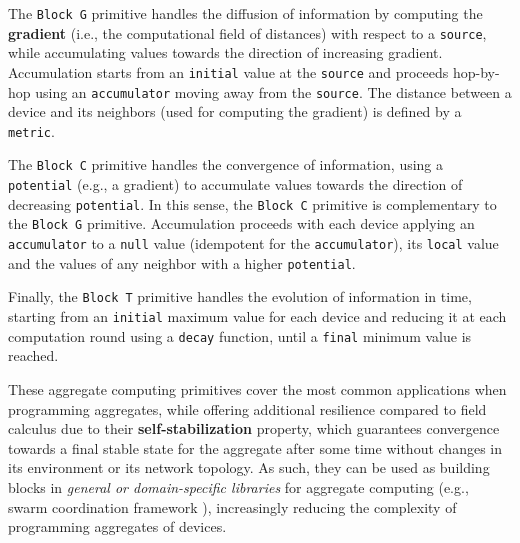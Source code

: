 The \texttt{Block G} primitive \cite{CAS-AggregateComputingBlocks} handles the
diffusion of information by computing the \textbf{gradient} (i.e., the
computational field of distances) with respect to a \texttt{source}, while
accumulating values towards the direction of increasing gradient. Accumulation
starts from an \texttt{initial} value at the \texttt{source} and proceeds
hop-by-hop using an \texttt{accumulator} moving away from the \texttt{source}.
The distance between a device and its neighbors (used for computing the
gradient) is defined by a \texttt{metric}.

The \texttt{Block C} primitive handles the convergence of information, using a
\texttt{potent\-ial} (e.g., a gradient) to accumulate values towards the
direction of decreasing \texttt{potent\-ial}. In this sense, the \texttt{Block
C} primitive is complementary to the \texttt{Block G} primitive. Accumulation
proceeds with each device applying an \texttt{accumulator} to a \texttt{null}
value (idempotent for the \texttt{accumulator}), its \texttt{local} value and
the values of any neighbor with a higher \texttt{potential}.

Finally, the \texttt{Block T} primitive handles the evolution of information in
time, starting from an \texttt{initial} maximum value for each device and
reducing it at each computation round using a \texttt{decay} function, until a
\texttt{final} minimum value is reached.

These aggregate computing primitives cover the most common applications when
programming aggregates, while offering additional resilience compared to field
calculus due to their \textbf{self-stabilization} property, which guarantees
convergence towards a final stable state for the aggregate after some time
without changes in its environment or its network topology. As such, they can
be used as building blocks in \textit{general or domain-specific libraries} for
aggregate computing (e.g., swarm coordination framework \cite{MacroSwarm}),
increasingly reducing the complexity of programming aggregates of devices.